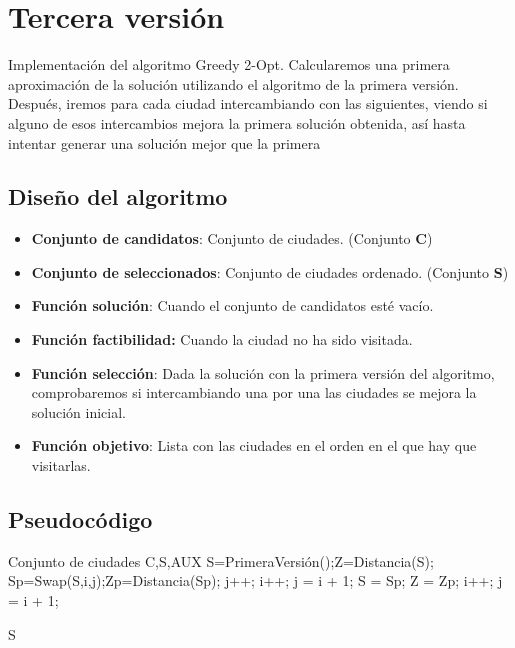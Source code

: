 	
	\section{Tercera versión} 
	
		Implementación del algoritmo Greedy 2-Opt. Calcularemos una primera aproximación de la solución utilizando el algoritmo de la primera versión. Después, iremos para cada ciudad intercambiando con las siguientes, viendo si alguno de esos intercambios mejora la primera solución obtenida, así hasta intentar generar una solución mejor que la primera
		
	\subsection{Diseño del algoritmo} 
	
		\begin{itemize}
			\item \textbf{Conjunto de candidatos}: Conjunto de ciudades. (Conjunto \textbf{C})
			\item \textbf{Conjunto de seleccionados}: Conjunto de ciudades ordenado. (Conjunto \textbf{S})
			\item \textbf{Función solución}: Cuando el conjunto de candidatos esté vacío.
			\item \textbf{Función factibilidad:} Cuando la ciudad no ha sido visitada.
			\item \textbf{Función selección}: Dada la solución con la primera versión del algoritmo, comprobaremos si intercambiando una por una las ciudades se mejora la solución inicial.
			\item \textbf{Función objetivo}: Lista con las ciudades en el orden en el que hay que visitarlas.		
		\end{itemize}
		
		
	\subsection{Pseudocódigo}

		\begin{algorithmic}				
			\Require Conjunto de ciudades C,S,AUX
			\State S=PrimeraVersión();Z=Distancia(S);
				\State Sp=Swap(S,i,j);Zp=Distancia(Sp);
					\State j++;
				\EndIf
					\State i++; j = i + 1; 
				\EndIf
					\State S = Sp; Z = Zp;
					\State i++; j = i + 1;
				\EndIf
			\EndWhile  
			
			\Return S	
			
		\end{algorithmic}
		

